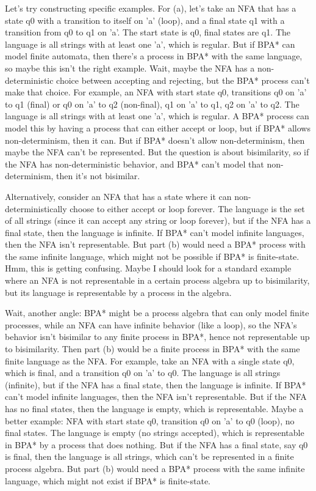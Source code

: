 Let's try constructing specific examples. For (a), let's take an NFA that has a state q0 with a transition to itself on 'a' (loop), and a final state q1 with a transition from q0 to q1 on 'a'. The start state is q0, final states are q1. The language is all strings with at least one 'a', which is regular. But if BPA* can model finite automata, then there's a process in BPA* with the same language, so maybe this isn't the right example. Wait, maybe the NFA has a non-deterministic choice between accepting and rejecting, but the BPA* process can't make that choice. For example, an NFA with start state q0, transitions q0 on 'a' to q1 (final) or q0 on 'a' to q2 (non-final), q1 on 'a' to q1, q2 on 'a' to q2. The language is all strings with at least one 'a', which is regular. A BPA* process can model this by having a process that can either accept or loop, but if BPA* allows non-determinism, then it can. But if BPA* doesn't allow non-determinism, then maybe the NFA can't be represented. But the question is about bisimilarity, so if the NFA has non-deterministic behavior, and BPA* can't model that non-determinism, then it's not bisimilar.

Alternatively, consider an NFA that has a state where it can non-deterministically choose to either accept or loop forever. The language is the set of all strings (since it can accept any string or loop forever), but if the NFA has a final state, then the language is infinite. If BPA* can't model infinite languages, then the NFA isn't representable. But part (b) would need a BPA* process with the same infinite language, which might not be possible if BPA* is finite-state. Hmm, this is getting confusing. Maybe I should look for a standard example where an NFA is not representable in a certain process algebra up to bisimilarity, but its language is representable by a process in the algebra.

Wait, another angle: BPA* might be a process algebra that can only model finite processes, while an NFA can have infinite behavior (like a loop), so the NFA's behavior isn't bisimilar to any finite process in BPA*, hence not representable up to bisimilarity. Then part (b) would be a finite process in BPA* with the same finite language as the NFA. For example, take an NFA with a single state q0, which is final, and a transition q0 on 'a' to q0. The language is all strings (infinite), but if the NFA has a final state, then the language is infinite. If BPA* can't model infinite languages, then the NFA isn't representable. But if the NFA has no final states, then the language is empty, which is representable. Maybe a better example: NFA with start state q0, transition q0 on 'a' to q0 (loop), no final states. The language is empty (no strings accepted), which is representable in BPA* by a process that does nothing. But if the NFA has a final state, say q0 is final, then the language is all strings, which can't be represented in a finite process algebra. But part (b) would need a BPA* process with the same infinite language, which might not exist if BPA* is finite-state.

